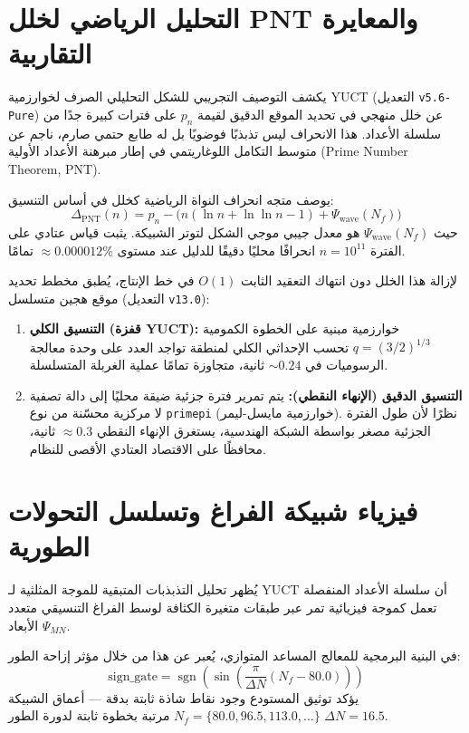 \documentclass[11pt,a4paper]{article}
\begin{document}
	\section{التحليل الرياضي لخلل PNT والمعايرة التقاربية}
	يكشف التوصيف التجريبي للشكل التحليلي الصرف لخوارزمية YUCT (التعديل \texttt{v5.6-Pure}) عن خلل منهجي في تحديد الموقع الدقيق لقيمة $p_n$ على فترات كبيرة جدًا من سلسلة الأعداد. هذا الانحراف ليس تذبذبًا فوضويًا بل له طابع حتمي صارم، ناجم عن متوسط التكامل اللوغاريتمي في إطار مبرهنة الأعداد الأولية (Prime Number Theorem, PNT).
	
	يوصف متجه انحراف النواة الرياضية كخلل في أساس التنسيق:
	\begin{equation}
		\Delta_{\mathrm{PNT}}(n) = p_n - \bigl( n(\ln n + \ln\ln n - 1) + \Psi_{\mathrm{wave}}(N_f) \bigr)
	\end{equation}
	حيث $\Psi_{\mathrm{wave}}(N_f)$ هو معدل جيبي موجي الشكل لتوتر الشبيكة. يثبت قياس عتادي على الفترة $n = 10^{11}$ انحرافًا محليًا دقيقًا للدليل عند مستوى $\approx 0.000012\%$ تمامًا.
	
	لإزالة هذا الخلل دون انتهاك التعقيد الثابت $O(1)$ في خط الإنتاج، يُطبق مخطط تحديد موقع هجين متسلسل (التعديل \texttt{v13.0}):
	\begin{enumerate}
		\item \textbf{التنسيق الكلي (قفزة YUCT):} خوارزمية مبنية على الخطوة الكمومية $q = (3/2)^{1/3}$ تحسب الإحداثي الكلي لمنطقة تواجد العدد على وحدة معالجة الرسوميات في $\sim 0.24$ ثانية، متجاوزة تمامًا عملية الغربلة المتسلسلة.
		\item \textbf{التنسيق الدقيق (الإنهاء النقطي):} يتم تمرير فترة جزئية ضيقة محليًا إلى دالة تصفية لا مركزية محسّنة من نوع \texttt{primepi} (خوارزمية مايسل-ليمر). نظرًا لأن طول الفترة الجزئية مصغر بواسطة الشبكة الهندسية، يستغرق الإنهاء النقطي $\approx 0.3$ ثانية، محافظًا على الاقتصاد العتادي الأقصى للنظام.
	\end{enumerate}
	
	\section{فيزياء شبيكة الفراغ وتسلسل التحولات الطورية}
	يُظهر تحليل التذبذبات المتبقية للموجة المثلثية لـ YUCT أن سلسلة الأعداد المنفصلة تعمل كموجة فيزيائية تمر عبر طبقات متغيرة الكثافة لوسط الفراغ التنسيقي متعدد الأبعاد $\Psi_{MN}$.
	
	في البنية البرمجية للمعالج المساعد المتوازي، يُعبر عن هذا من خلال مؤثر إزاحة الطور:
	\begin{equation}
		\mathrm{sign\_gate} = \operatorname{sgn}\!\left(\sin\!\left(\frac{\pi}{\Delta N} (N_f - 80.0)\right)\right)
	\end{equation}
	يؤكد توثيق المستودع وجود نقاط شاذة ثابتة بدقة — أعماق الشبيكة $N_f = \{80.0, 96.5, 113.0, \dots\}$ مرتبة بخطوة ثابتة لدورة الطور $\Delta N = 16.5$.
	
\end{document}
